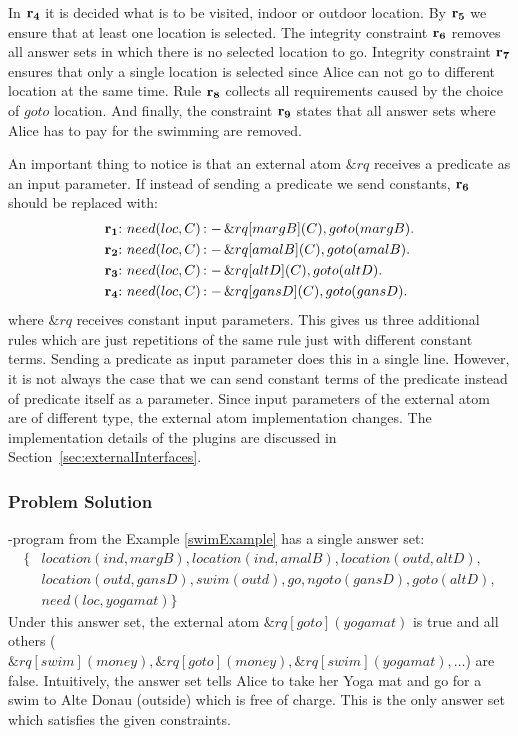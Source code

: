 \documentclass[a4paper, titlepage]{article}
\newcommand{\ext}[3]{\ensuremath{\&{#1}[#2](#3)}}
\DeclareMathOperator{\leftimpl}{:-}
\newcommand{\row}[1]{%
  \ensuremath{\color{black}\ensuremath{\mathbf{#1}} \color{black}}%
}
\newcommand{\rowprefix}[1]{%
  \ensuremath{\color{black}\mathbf{#1{:}}\ }%
}
\begin{document}
In $\row{r_4}$ it is decided what is to be visited, indoor or 
outdoor location. By $\row{r_5}$ we ensure that at least one location is selected. The integrity constraint $\row{r_6}$ removes all answer sets in which there is no selected location to go. Integrity constraint $\row{r_7}$ ensures that only a single location is selected since Alice can not go to different location at the same time. Rule $\row{r_8}$ collects all requirements caused by 
the choice of $\mathit{goto}$ location. And finally, the constraint $\row{r_9}$ states that all answer sets where 
Alice has to pay for the swimming are removed.

An important thing to notice is that an external atom 
$\mathit{\&rq}$ receives a predicate as an input parameter. If instead of sending a predicate we send 
constants, $\row{r_6}$ should be replaced with:
\begin{align*}
\rowprefix{r_1}& need(loc, C) \leftimpl \ext{rq}{margB}{C}, 
goto(margB).\\
\rowprefix{r_2}& need(loc, C) \leftimpl \ext{rq}{amalB}{C}, 
goto(amalB).\\
\rowprefix{r_3}& need(loc, C) \leftimpl \ext{rq}{altD}{C}, 
goto(altD).\\
\rowprefix{r_4}& need(loc, C) \leftimpl \ext{rq}{gansD}{C}, 
goto(gansD).
\end{align*}    
where $\&rq$ receives constant input parameters. This gives us three additional rules which are just 
repetitions of the same rule just with different constant 
terms. Sending a predicate as input parameter does this in a 
single line. However, it is not always the case that we can send constant terms of the predicate instead of predicate itself  as a parameter. Since input parameters of the external atom are of different type, the external atom implementation changes. The implementation details of the plugins are discussed in Section~\ref{sec:externalInterfaces}.

\subsubsection{Problem Solution}
\hex{}-program from the Example \ref{swimExample} has a 
single answer set:
\begin{align*}
\{ & 
location(ind,margB),location(ind,amalB),location(outd,altD), 
\\
& location(outd,gansD), 
swim(outd),go,ngoto(gansD),goto(altD),\\
& need(loc,yogamat) \} 
\end{align*}
Under this answer set, the external atom $\ext{rq}{goto}
{yogamat}$ is true and all others ($\ext{rq}{swim}
{money}, \ext{rq}{goto}{money}, \ext{rq}{swim}{yogamat}, 
\dots $) are false. Intuitively, the answer set tells Alice to 
take her Yoga mat and go for a swim to Alte Donau (outside) 
which is free of charge. This is the only answer set which 
satisfies the given constraints.    
\end{document}
